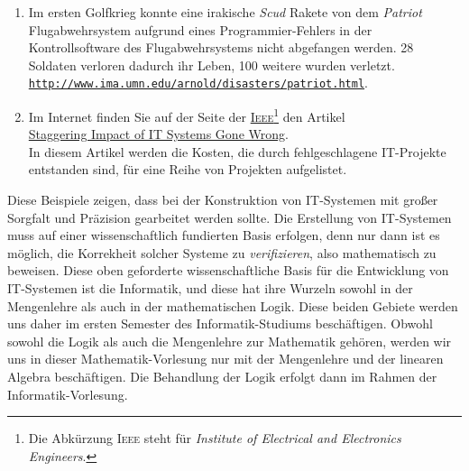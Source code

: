 \begin{enumerate}
\begin{enumerate}
            Einen detailierten Bericht über diese Unfälle finden Sie unter \\[0.2cm]
            \hspace*{1.3cm} 
            \href{http://courses.cs.vt.edu/~cs3604/lib/Therac_25/Therac\_1.html}{\texttt{http://courses.cs.vt.edu/cs3604/lib/Therac\_25/Therac\_1.html}}.
      \item Im ersten Golfkrieg konnte eine irakische \textsl{Scud} Rakete von dem \textsl{Patriot}
            Flugabwehrsystem aufgrund eines Programmier-Fehlers in der Kontrollsoftware des Flugabwehrsystems
            nicht abgefangen werden.  28 Soldaten verloren dadurch ihr Leben, 100 weitere wurden
            verletzt. \\[0.2cm]
            \hspace*{1.3cm} 
            \href{http://www.ima.umn.edu/~arnold/disasters/patriot.html}{\texttt{http://www.ima.umn.edu/arnold/disasters/patriot.html}}.
      \item Im Internet finden Sie auf der Seite der
            \href{https://de.wikipedia.org/wiki/Institute_of_Electrical_and_Electronics_Engineers}{\textsc{Ieee}}\footnote{
              Die Abkürzung \textsc{Ieee} steht für \emph{Institute of Electrical and Electronics Engineers}.}
            den Artikel   
            \\[0.2cm]
            \hspace*{1.3cm}
            \href{http://spectrum.ieee.org/static/the-staggering-impact-of-it-systems-gone-wrong}{Staggering Impact of IT Systems Gone Wrong}.
            \\[0.2cm]
            In diesem Artikel werden die Kosten, die durch fehlgeschlagene IT-Projekte entstanden sind, für eine Reihe von Projekten aufgelistet.
      \end{enumerate}
      Diese Beispiele zeigen, dass bei der Konstruktion von IT-Systemen mit großer Sorgfalt
      und Präzision gearbeitet werden sollte.  Die Erstellung von IT-Systemen muss auf einer 
      wissenschaftlich fundierten Basis erfolgen, denn nur dann ist es möglich, die Korrekheit
      solcher Systeme zu \emph{verifizieren}, also mathematisch zu beweisen.
      Diese oben geforderte wissenschaftliche Basis für die Entwicklung von IT-Systemen ist die Informatik, 
      und diese hat ihre Wurzeln sowohl in der Mengenlehre als auch in der mathematischen
      Logik.  Diese beiden Gebiete werden uns daher im ersten Semester
      des Informatik-Studiums beschäftigen.  Obwohl sowohl die Logik als auch die Mengenlehre zur
      Mathematik gehören, werden wir uns in dieser Mathematik-Vorlesung nur mit der Mengenlehre und
      der linearen Algebra beschäftigen.  Die Behandlung der Logik erfolgt dann im Rahmen der
      Informatik-Vorlesung. 
\end{enumerate}

